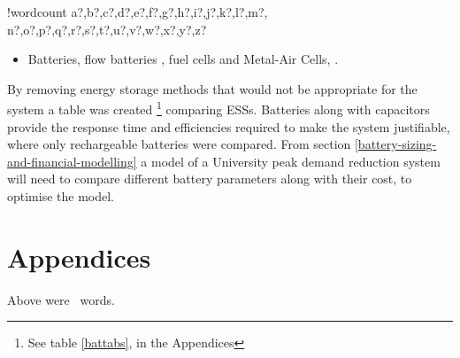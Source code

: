 \documentclass[fontsize=9.5pt]{extarticle}
\providecommand{\tightlist}{%
  \setlength{\itemsep}{0pt}\setlength{\parskip}{0pt}}
\newcounter{words}
\newenvironment{counted}{%
  \setcounter{words}{0}
  \SearchList!{wordcount}{\stepcounter{words}}
    {a?,b?,c?,d?,e?,f?,g?,h?,i?,j?,k?,l?,m?,
    n?,o?,p?,q?,r?,s?,t?,u?,v?,w?,x?,y?,z?}
  \UndoBoundary{'}
  \SearchOrder{p;}}{%
  \StopSearching}
\begin{document}
\begin{counted}
\begin{itemize}
  \begin{itemize}
  \tightlist
  \item
    Batteries, flow batteries \cite{flowbatstan}, fuel cells and
    Metal-Air Cells\cite{Chen2009291}, \cite{batuni}.
  \end{itemize}
\end{itemize}

By removing energy storage methods that would not be appropriate for the
system a table was created
\footnote{See table \ref{battabs}, in the Appendices} comparing ESSs.
Batteries along with capacitors provide the response time
\cite{Choudar201521} and efficiencies required to make the system
justifiable, where only rechargeable batteries were compared. From
section \ref{battery-sizing-and-financial-modelling} a model of a
University peak demand reduction system will need to compare different
battery parameters along with their cost, to optimise the model.

\newpage

\end{counted} %

\newpage
\section{Appendices}
Above were \thewords\ words. %
\newpage

% 

\printbibliography
\end{document}
